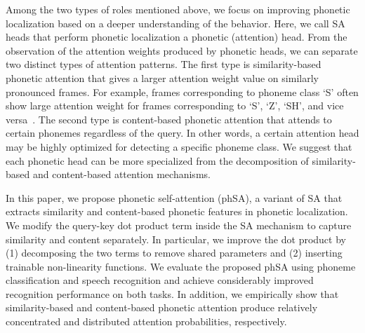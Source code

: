 Among the two types of roles mentioned above, we focus on improving phonetic localization based on a deeper understanding of the behavior.
Here, we call SA heads that perform phonetic localization a phonetic (attention) head.
From the observation of the attention weights produced by phonetic heads, we can separate two distinct types of attention patterns.
The first type is similarity-based phonetic attention that gives a larger attention weight value on similarly pronounced frames. 
For example, frames corresponding to phoneme class `S' often show large attention weight for frames corresponding to `S', `Z', `SH', and vice versa~\cite{understanding}.
The second type is content-based phonetic attention that attends to certain phonemes regardless of the query.
In other words, a certain attention head may be highly optimized for detecting a specific phoneme class.
We suggest that each phonetic head can be more specialized from the decomposition of similarity-based and content-based attention mechanisms.

In this paper, we propose phonetic self-attention (phSA), a variant of SA that extracts similarity and content-based phonetic features in phonetic localization.
We modify the query-key dot product term inside the SA mechanism to capture similarity and content separately.
In particular, we improve the dot product by (1) decomposing the two terms to remove shared parameters and (2) inserting trainable non-linearity functions.
We evaluate the proposed phSA using phoneme classification and speech recognition and achieve considerably improved recognition performance on both tasks.
In addition, we empirically show that similarity-based and content-based phonetic attention produce relatively concentrated and distributed attention probabilities, respectively.